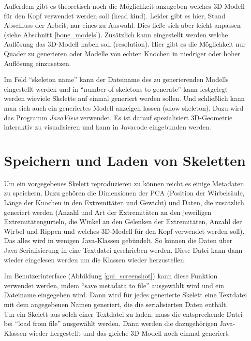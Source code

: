 Außerdem gibt es theoretisch noch die Möglichkeit anzugeben welches 3D-Modell für den Kopf verwendet werden soll (head kind). Leider gibt es hier, Stand Abschluss der Arbeit, nur eines zu Auswahl. Dies ließe sich aber leicht anpassen (siehe Abschnitt \ref{bone_models}).
Zusätzlich kann eingestellt werden welche Auflösung das 3D-Modell haben soll (resolution). Hier gibt es die Möglichkeit nur Quader zu generieren oder Modelle von echten Knochen in niedriger oder hoher Auflösung einzusetzen.

Im Feld "`skeleton name"' kann der Dateiname des zu generierenden Modells eingestellt werden und in "`number of skeletons to generate"' kann festgelegt werden wieviele Skelette auf einmal generiert werden sollen. Und schließlich kann man sich auch ein generiertes Modell anzeigen lassen (show skeleton). Dazu wird das Programm \emph{JavaView} \cite{JavaView} verwendet. Es ist darauf spezialisiert 3D-Geometrie interaktiv zu visualisieren und kann in Javacode eingebunden werden.


\section{Speichern und Laden von Skeletten}
\label{load_skeletons}

Um ein vorgegebenes Skelett reproduzieren zu können reicht es einige Metadaten zu speichern. Dazu gehören die Dimensionen der PCA (Position der Wirbelsäule, Länge der Knochen in den Extremitäten und Gewicht) und Daten, die zusätzlich generiert werden (Anzahl und Art der Extremitäten an den jeweiligen Extremitätengürteln, die Winkel an den Gelenken der Extremitäten, Anzahl der Wirbel und Rippen und welches 3D-Modell für den Kopf verwendet werden soll).
Das alles wird in wenigen Java-Klassen gebündelt. So können die Daten über Java-Serialisierung \cite{JavaSerialization} in eine Textdatei geschrieben werden. Diese Datei kann dann wieder eingelesen werden um die Klassen wieder herzustellen.

Im Benutzerinterface (Abbildung \ref{gui_screenshot}) kann diese Funktion verwendet werden, indem "`save metadata to file"' ausgewählt wird und ein Dateiname eingegeben wird. Dann wird für jedes generierte Skelett eine Textdatei mit dem angegebenen Namen generiert, die die serialisierten Daten enthält.\\
Um ein Skelett aus solch einer Textdatei zu laden, muss die entsprechende Datei bei "`load from file"' ausgewählt werden. Dann werden die dazugehörigen Java-Klassen wieder hergestellt und das gleiche 3D-Modell noch einmal generiert.

